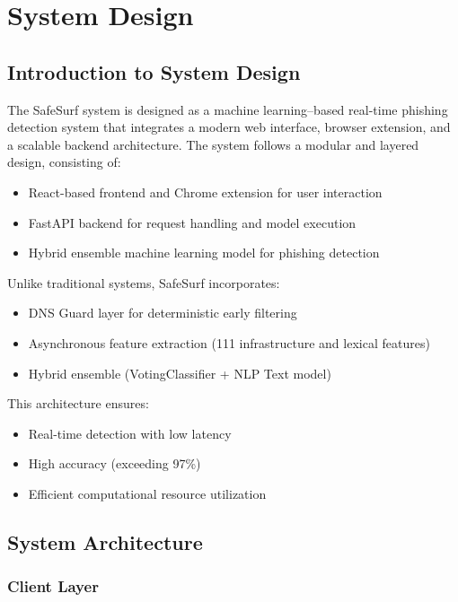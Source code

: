 \chapter{System Design}

\section{Introduction to System Design}

The SafeSurf system is designed as a machine learning--based real-time phishing detection system that integrates a modern web interface, browser extension, and a scalable backend architecture.
\noindent
The system follows a modular and layered design, consisting of:

\begin{itemize}
    \item React-based frontend and Chrome extension for user interaction
    \item FastAPI backend for request handling and model execution \cite{ref10}
    \item Hybrid ensemble machine learning model for phishing detection \cite{ref11}
\end{itemize}
\noindent
Unlike traditional systems, SafeSurf incorporates:

\begin{itemize}
    \item DNS Guard layer for deterministic early filtering
    \item Asynchronous feature extraction (111 infrastructure and lexical features)
    \item Hybrid ensemble (VotingClassifier + NLP Text model)
\end{itemize}
\noindent
This architecture ensures:

\begin{itemize}
    \item Real-time detection with low latency
    \item High accuracy (exceeding 97\%)
    \item Efficient computational resource utilization
\end{itemize}

\section{System Architecture}

\subsection{Client Layer}

